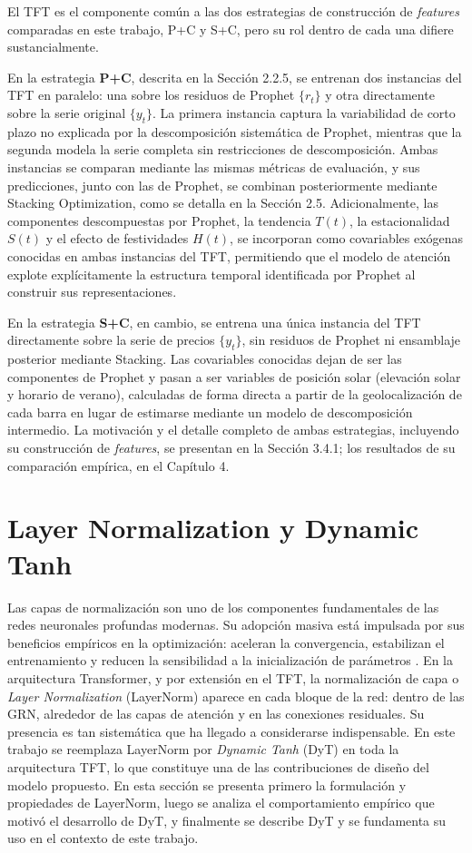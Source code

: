 El TFT es el componente común a las dos estrategias de construcción de \textit{features} comparadas en este trabajo, P+C y S+C, pero su rol dentro de cada una difiere sustancialmente.

En la estrategia \textbf{P+C}, descrita en la Sección 2.2.5, se entrenan dos instancias del TFT en paralelo: una sobre los residuos de Prophet $\{r_t\}$ y otra directamente sobre la serie original $\{y_t\}$. La primera instancia captura la variabilidad de corto plazo no explicada por la descomposición sistemática de Prophet, mientras que la segunda modela la serie completa sin restricciones de descomposición. Ambas instancias se comparan mediante las mismas métricas de evaluación, y sus predicciones, junto con las de Prophet, se combinan posteriormente mediante Stacking Optimization, como se detalla en la Sección 2.5. Adicionalmente, las componentes descompuestas por Prophet, la tendencia $T(t)$, la estacionalidad $S(t)$ y el efecto de festividades $H(t)$, se incorporan como covariables exógenas conocidas en ambas instancias del TFT, permitiendo que el modelo de atención explote explícitamente la estructura temporal identificada por Prophet al construir sus representaciones.

En la estrategia \textbf{S+C}, en cambio, se entrena una única instancia del TFT directamente sobre la serie de precios $\{y_t\}$, sin residuos de Prophet ni ensamblaje posterior mediante Stacking. Las covariables conocidas dejan de ser las componentes de Prophet y pasan a ser variables de posición solar (elevación solar y horario de verano), calculadas de forma directa a partir de la geolocalización de cada barra en lugar de estimarse mediante un modelo de descomposición intermedio. La motivación y el detalle completo de ambas estrategias, incluyendo su construcción de \textit{features}, se presentan en la Sección 3.4.1; los resultados de su comparación empírica, en el Capítulo 4.

\section{Layer Normalization y Dynamic Tanh}
 
Las capas de normalización son uno de los componentes fundamentales de las redes neuronales profundas modernas. Su adopción masiva está impulsada por sus beneficios empíricos en la optimización: aceleran la convergencia, estabilizan el entrenamiento y reducen la sensibilidad a la inicialización de parámetros \cite{LNInTransformers}. En la arquitectura Transformer, y por extensión en el TFT, la normalización de capa o \textit{Layer Normalization} (LayerNorm) aparece en cada bloque de la red: dentro de las GRN, alrededor de las capas de atención y en las conexiones residuales. Su presencia es tan sistemática que ha llegado a considerarse indispensable. En este trabajo se reemplaza LayerNorm por \textit{Dynamic Tanh} (DyT) \cite{Zhu2025Transformers} en toda la arquitectura TFT, lo que constituye una de las contribuciones de diseño del modelo propuesto. En esta sección se presenta primero la formulación y propiedades de LayerNorm, luego se analiza el comportamiento empírico que motivó el desarrollo de DyT, y finalmente se describe DyT y se fundamenta su uso en el contexto de este trabajo.
 
